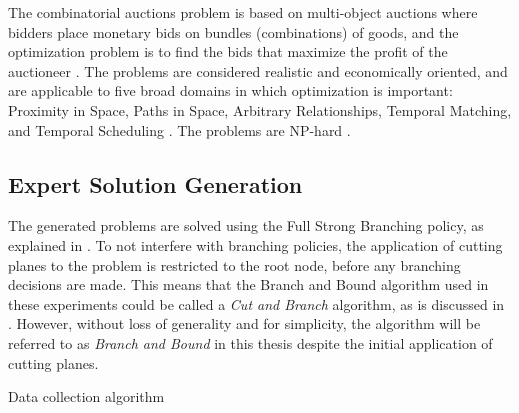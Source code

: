 The combinatorial auctions problem is based on multi-object auctions where bidders place monetary bids on bundles (combinations) of goods, and the optimization problem is to find the bids that maximize the profit of the auctioneer \cite{brown2000towards}. The problems are considered realistic and economically oriented, and are applicable to five broad domains in which optimization is important: Proximity in Space, Paths in Space, Arbitrary Relationships, Temporal Matching, and Temporal Scheduling \cite{brown2000towards}. The problems are \gls{NP}-hard \cite{dong2012combinatorial}. 









\subsection{Expert Solution Generation}\label{ssec:expertsolutiongeneration}

The generated problems are solved using the Full Strong Branching policy, as explained in . To not interfere with branching policies, the application of cutting planes to the problem is restricted to the root node, before any branching decisions are made. This means that the Branch and Bound algorithm used in these experiments could be called a \textit{Cut and Branch} algorithm, as is discussed in .
However, without loss of generality and for simplicity, the algorithm will be referred to as \textit{Branch and Bound} in this thesis despite the initial application of cutting planes.  


\begin{algorithm}[H]
    \SetAlgoLined
    
    \caption{\label{alg:datacol} Data collection algorithm}
\end{algorithm}


